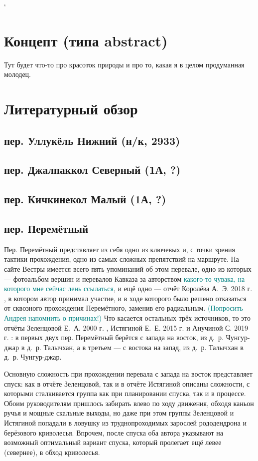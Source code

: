 \documentclass[a4paper, 12pt]{report}
\begin{document}
`
\tableofcontents








\section{Концепт (типа abstract)} 
Тут будет что-то про красоток природы и про то, какая я в целом продуманная молодец.
\section{Литературный обзор}

\subsection{пер. Уллукёль Нижний (н/к, 2933)} 
\subsection{пер. Джалпаккол Северный (1А, ?)} 
\subsection{пер. Кичкинекол Малый (1А, ?)} 
\subsection{пер. Перемётный} 
Пер. Перемётный представляет из себя одно из ключевых и, с точки зрения тактики прохождения, одно из самых сложных препятствий на маршруте. На сайте Вестры \cite{WestraCat} имеется всего пять упоминаний об этом перевале, одно из которых — фотоальбом вершин и перевалов Кавказа за авторством \textcolor{teal}{какого-то чувака, на которого мне сейчас лень ссылаться}, и ещё одно — отчёт Королёва А.~Э. 2018 г. \cite{Korolyov2018}, в котором автор принимал участие, и в ходе которого было решено отказаться от сквозного прохождения Перемётного, заменив его радиальным. \textcolor{teal}{(Попросить Андрея напомнить о причинах!)} Что касается остальных трёх источников, то это отчёты Зеленцовой Е.~А. 2000 г. \cite{Zelentsova2000}, Истягиной Е.~Е. 2015 г. и Анучиной С. 2019 г. \cite{Anuchina2019}: в первых двух пер. Перемётный берётся с запада на восток, из д.~р. Чунгур-джар в д.~р. Талычхан, а в третьем --- с востока на запад, из д.~р. Талычхан в д.~р. Чунгур-джар. 

Основную сложность при прохождении перевала с запада на восток представляет спуск: как в отчёте Зеленцовой, так и в отчёте Истягиной описаны сложности, с которыми сталкивается группа как при планировании спуска, так и в процессе. Обоим руководителям пришлось забирать влево по ходу движения, обходя каньон ручья и мощные скальные выходы, но даже при этом группы Зеленцовой и Истягиной попадали в ловушку из труднопроходимых зарослей рододендрона и берёзового криволесья. Впрочем, после спуска оба автора указывают на возможный оптимальный вариант спуска, который пролегает ещё левее (севернее), в обход криволесья. 
\end{document}
